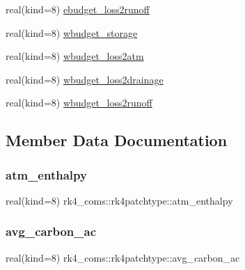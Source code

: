 \begin{DoxyCompactItemize}
real(kind=8) \hyperlink{structrk4__coms_1_1rk4patchtype_a8fc0d8ee10c1514c9ec0f1170dedab04}{ebudget\+\_\+loss2runoff}
\item 
real(kind=8) \hyperlink{structrk4__coms_1_1rk4patchtype_a8353e7ef490e77bb14d49b4c6151e1d9}{wbudget\+\_\+storage}
\item 
real(kind=8) \hyperlink{structrk4__coms_1_1rk4patchtype_a1ac1fd5a180e1c1b79dbce1f2bb6fe8b}{wbudget\+\_\+loss2atm}
\item 
real(kind=8) \hyperlink{structrk4__coms_1_1rk4patchtype_a75224b0fce27f5ff820fc0b2b55cb8fc}{wbudget\+\_\+loss2drainage}
\item 
real(kind=8) \hyperlink{structrk4__coms_1_1rk4patchtype_aa85e77ba1392352ea0c61466b5d6b542}{wbudget\+\_\+loss2runoff}
\end{DoxyCompactItemize}


\subsection{Member Data Documentation}
\mbox{\label{structrk4__coms_1_1rk4patchtype_a79ae2ab2774fdd900ec72046deff600b}} 
\subsubsection{\texorpdfstring{atm\+\_\+enthalpy}{atm\_enthalpy}}
{\footnotesize\ttfamily real(kind=8) rk4\+\_\+coms\+::rk4patchtype\+::atm\+\_\+enthalpy}

\mbox{\label{structrk4__coms_1_1rk4patchtype_ad6e6550176dfb89feebfd941165e2449}} 
\subsubsection{\texorpdfstring{avg\+\_\+carbon\+\_\+ac}{avg\_carbon\_ac}}
{\footnotesize\ttfamily real(kind=8) rk4\+\_\+coms\+::rk4patchtype\+::avg\+\_\+carbon\+\_\+ac}

\mbox{\label{structrk4__coms_1_1rk4patchtype_a410ab0421800f82d20802b590159b4d2}} 
